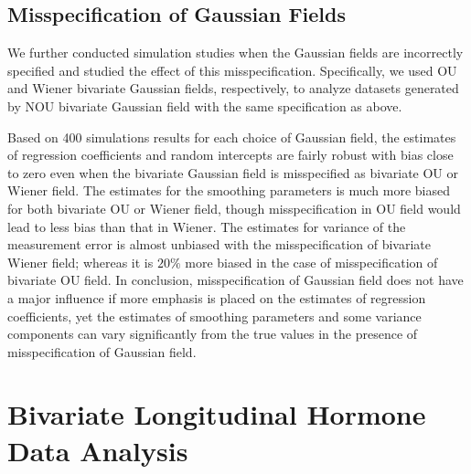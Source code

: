 \documentclass[article,lineno]{biometrika}
\begin{document}
\subsection{Misspecification of Gaussian Fields}

We further conducted simulation studies when the Gaussian fields are incorrectly specified and studied the effect of this misspecification. Specifically, we used OU and Wiener bivariate Gaussian fields, respectively, to analyze datasets generated by NOU bivariate Gaussian field with the same specification as above.

Based on 400 simulations results for each choice of Gaussian field, the estimates of regression coefficients and random intercepts are fairly robust with bias close to zero even when the bivariate Gaussian field is misspecified as bivariate OU or Wiener field. The estimates for the smoothing parameters is much more biased for both bivariate OU or Wiener field, though misspecification in OU field would lead to less bias than that in Wiener. The estimates for variance of the measurement error is almost unbiased with the misspecification of bivariate Wiener field; whereas it is $20\%$ more biased in the case of misspecification of bivariate OU field. In conclusion, misspecification of Gaussian field does not  have a major influence if more emphasis is placed on the estimates of regression coefficients, yet the estimates of smoothing parameters and some variance components can vary significantly from the true values in the presence of misspecification of Gaussian field. 

%
%
%

\section{Bivariate Longitudinal Hormone Data Analysis} \label{dataAnalysis}
\end{document}
